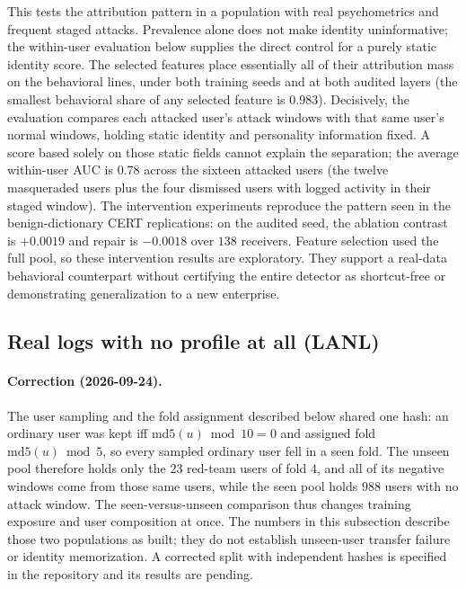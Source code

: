 \documentclass[10pt]{article} %
\begin{document}
This tests the attribution pattern in a population with real
psychometrics and frequent staged attacks. Prevalence alone does not
make identity uninformative; the within-user evaluation below supplies
the direct control for a purely static identity score.
The selected features place essentially all of their attribution mass
on the behavioral lines, under both training seeds and at both audited
layers (the smallest behavioral share of any selected feature is
$0.983$). Decisively, the evaluation compares each attacked user's
attack windows with that same user's normal windows, holding static identity
and personality information fixed. A score based solely on
those static fields cannot explain the separation; the average within-user AUC is $0.78$ across the
sixteen attacked users (the twelve masqueraded users plus the four
dismissed users with logged activity in their staged window). The intervention experiments reproduce the
pattern seen in the benign-dictionary CERT replications: on the
audited seed, the ablation contrast is $+0.0019$ and repair is
$-0.0018$ over $138$ receivers. Feature selection used the full pool,
so these intervention results are exploratory. They support a
real-data behavioral counterpart without certifying the entire detector
as shortcut-free or demonstrating generalization to a new enterprise.

\subsection{Real logs with no profile at all (LANL)}
\label{sec:lanl}

\paragraph{Correction (2026-09-24).} The user sampling and the fold
assignment described below shared one hash: an ordinary user was kept iff
$\mathrm{md5}(u) \bmod 10 = 0$ and assigned fold $\mathrm{md5}(u) \bmod 5$,
so every sampled ordinary user fell in a seen fold. The unseen pool therefore
holds only the $23$ red-team users of fold $4$, and all of its negative
windows come from those same users, while the seen pool holds $988$ users with
no attack window. The seen-versus-unseen comparison thus changes training
exposure and user composition at once. The numbers in this subsection describe
those two populations as built; they do not establish unseen-user transfer
failure or identity memorization. A corrected split with independent hashes is
specified in the repository and its results are pending.
\end{document}
